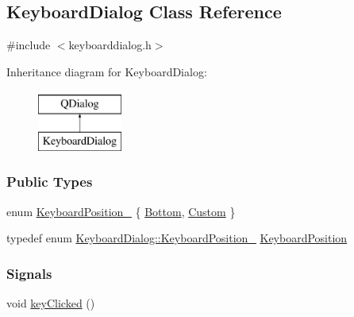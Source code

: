 \hypertarget{classKeyboardDialog}{}\subsection{Keyboard\+Dialog Class Reference}
\label{classKeyboardDialog}


{\ttfamily \#include $<$keyboarddialog.\+h$>$}

Inheritance diagram for Keyboard\+Dialog\+:\begin{figure}[H]
\begin{center}
\leavevmode
\includegraphics[height=2.000000cm]{classKeyboardDialog}
\end{center}
\end{figure}
\subsubsection*{Public Types}
\begin{DoxyCompactItemize}
\item 
enum \mbox{\hyperlink{classKeyboardDialog_a7151e64aa0ea07c96bcb582722f39b70}{Keyboard\+Position\+\_\+}} \{ \mbox{\hyperlink{classKeyboardDialog_a7151e64aa0ea07c96bcb582722f39b70a39f2161b184336fbdea336949a1c432b}{Bottom}}, 
\mbox{\hyperlink{classKeyboardDialog_a7151e64aa0ea07c96bcb582722f39b70ae3f3821683c5ddc59b87508d3f67d6eb}{Custom}}
 \}
\item 
typedef enum \mbox{\hyperlink{classKeyboardDialog_a7151e64aa0ea07c96bcb582722f39b70}{Keyboard\+Dialog\+::\+Keyboard\+Position\+\_\+}} \mbox{\hyperlink{classKeyboardDialog_a15d9e75dad34470ec9872ca45b63e510}{Keyboard\+Position}}
\end{DoxyCompactItemize}
\subsubsection*{Signals}
\begin{DoxyCompactItemize}
\item 
void \mbox{\hyperlink{classKeyboardDialog_a60a486df4f0be9c78a1ac6615aea3d9e}{key\+Clicked}} ()
\end{DoxyCompactItemize}
